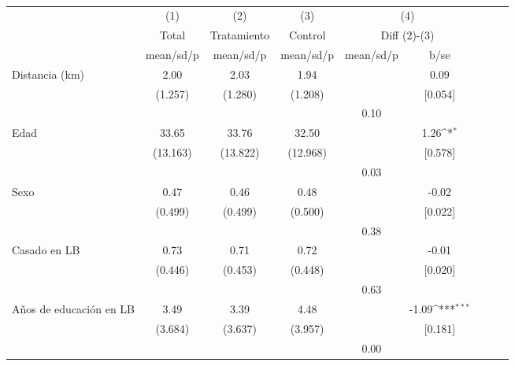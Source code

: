 \begin{table}[htbp]\centering
\def\sym#1{\ifmmode^{#1}\else\(^{#1}\)\fi}
\caption{}
\begin{tabular}{l*{4}{cc}}
\hline\hline
                &\multicolumn{1}{c}{(1)}&\multicolumn{1}{c}{(2)}&\multicolumn{1}{c}{(3)}&\multicolumn{2}{c}{(4)}     \\
                &\multicolumn{1}{c}{Total}&\multicolumn{1}{c}{Tratamiento}&\multicolumn{1}{c}{Control}&\multicolumn{2}{c}{Diff (2)-(3)}\\
                &mean/sd/p&mean/sd/p&mean/sd/p&mean/sd/p&     b/se         \\
\hline
\hspace{0.2cm}Distancia (km)&     2.00&     2.03&     1.94&         &     0.09         \\
                &  (1.257)&  (1.280)&  (1.208)&         &  [0.054]         \\
                &         &         &         &     0.10&                  \\
\hspace{0.2cm}Edad&    33.65&    33.76&    32.50&         &     1.26\sym{*}  \\
                & (13.163)& (13.822)& (12.968)&         &  [0.578]         \\
                &         &         &         &     0.03&                  \\
\hspace{0.2cm}Sexo&     0.47&     0.46&     0.48&         &    -0.02         \\
                &  (0.499)&  (0.499)&  (0.500)&         &  [0.022]         \\
                &         &         &         &     0.38&                  \\
\hspace{0.2cm}Casado en LB&     0.73&     0.71&     0.72&         &    -0.01         \\
                &  (0.446)&  (0.453)&  (0.448)&         &  [0.020]         \\
                &         &         &         &     0.63&                  \\
\hspace{0.2cm}Años de educación en LB&     3.49&     3.39&     4.48&         &    -1.09\sym{***}\\
                &  (3.684)&  (3.637)&  (3.957)&         &  [0.181]         \\
                &         &         &         &     0.00&                  \\

\end{tabular}
\end{table}
